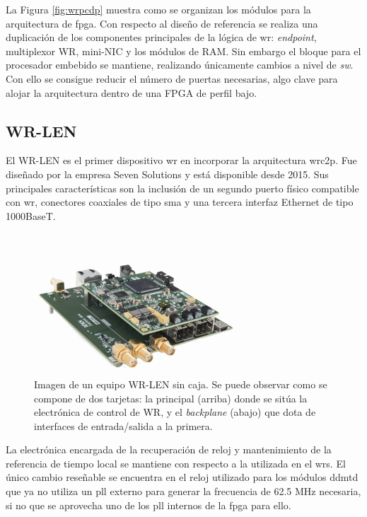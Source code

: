 La Figura \ref{fig:wrpcdp} muestra como se organizan los módulos para la 
arquitectura de \gls{fpga}. Con respecto al diseño de referencia se realiza una 
duplicación de los componentes principales de la lógica de \gls{wr}: 
\textit{endpoint}, multiplexor WR, mini-NIC  
y los módulos de RAM. Sin embargo el bloque para el procesador embebido se 
mantiene, realizando únicamente cambios a nivel de \textit{sw}. Con ello se 
consigue reducir el número de puertas necesarias, algo clave para alojar la 
arquitectura dentro de una FPGA de perfil bajo.

\subsection{WR-LEN}

El WR-LEN es el primer dispositivo \gls{wr} en incorporar la arquitectura 
\gls{wrc2p}. Fue diseñado por la empresa Seven Solutions y está disponible 
desde 2015. Sus principales características son la inclusión de un segundo 
puerto físico compatible con \gls{wr}, conectores coaxiales de tipo \gls{sma} y 
una tercera interfaz Ethernet de tipo 1000BaseT.

\begin{figure}
	\centering
	\includegraphics[width=0.7\linewidth]{imagenes/wrlen}
	\caption[WR-LEN en su versión para desarrolladores]{Imagen de un equipo 
	WR-LEN sin caja. Se puede observar como se compone de dos tarjetas: la 
	principal (arriba) donde se sitúa la electrónica de control de WR, y el 
	\textit{backplane} (abajo) que dota de interfaces de entrada/salida a la 
	primera.}
	\label{fig:wrlen}
\end{figure}


La electrónica encargada de la recuperación de reloj y mantenimiento de la 
referencia de tiempo local se mantiene con respecto a la utilizada en el 
\gls{wrs}.  El 
único cambio reseñable se encuentra en el reloj utilizado para los módulos 
\gls{ddmtd} que ya no utiliza un \gls{pll} externo para generar la frecuencia 
de 62.5 MHz necesaria, si no que se aprovecha uno de los \gls{pll} internos de 
la \gls{fpga} para ello. 

